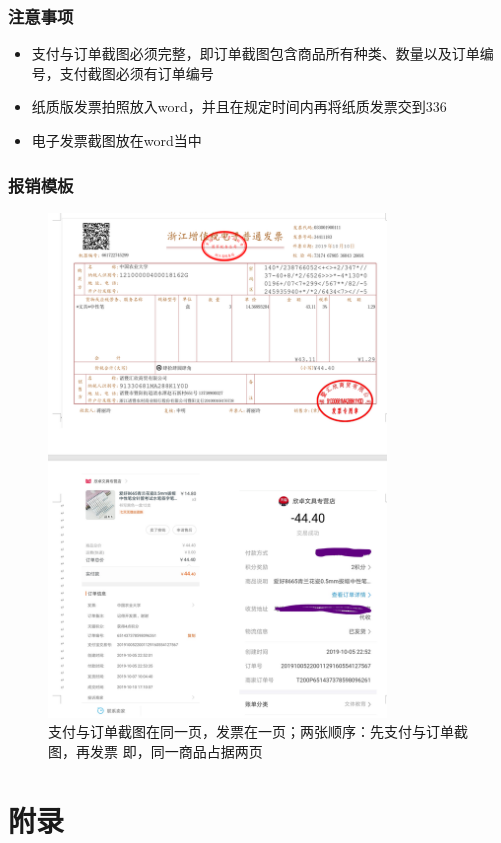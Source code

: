\documentclass{ctexbook}
\begin{document}
\subsection{注意事项}
\begin{itemize}
    \item 支付与订单截图必须完整，即订单截图包含商品所有种类、数量以及订单编号，支付截图必须有订单编号
    \item 纸质版发票拍照放入word，并且在规定时间内再将纸质发票交到336
    \item 电子发票截图放在word当中
\end{itemize}
\subsection{报销模板}
\begin{figure}
    \centering
    \includegraphics[width=0.8\textwidth]{fig/发票报销.png}
    \caption{支付与订单截图在同一页，发票在一页；两张顺序：先支付与订单截图，再发票
    即，同一商品占据两页}
\end{figure}

\chapter{附录}
\end{document}
